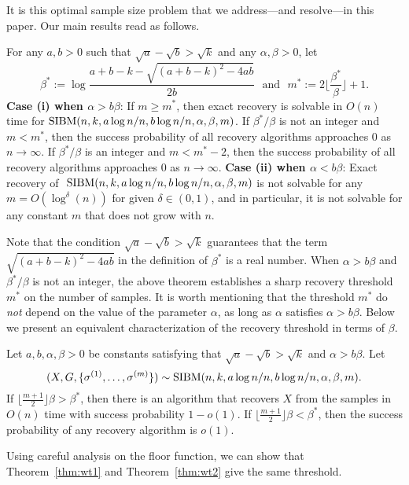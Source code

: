 \documentclass{article}
\begin{document}
\vspace*{.1in}  It is this optimal sample size problem that we address---and resolve---in this paper. 
Our main results read as follows.

\begin{theorem} \label{thm:wt1}
For any $a,b> 0$ such that $\sqrt{a}-\sqrt{b}> \sqrt{k}$ and any $\alpha,\beta>0$, let
\begin{equation} \label{eq:defstar}
\beta^\ast := 
\log\frac{a+b-k-\sqrt{(a+b-k)^2-4ab}}{2 b} \text{~~and~~}
m^\ast := 2 \Big\lfloor \frac{\beta^\ast}{\beta} \Big\rfloor +1  .
\end{equation}
{\bf Case (i) when $\alpha>b\beta$}: If $m\ge m^\ast$, then exact recovery is solvable in $O(n)$ time for $\SIBM(n,k, a\log n/n, \linebreak[4] b\log n/n,\alpha,\beta,m)$.
If $\beta^\ast/\beta$ is not an integer and $m < m^*$, then the success probability of all recovery algorithms approaches $0$ as $n\to\infty$. If $\beta^\ast/\beta$ is an integer and $m < m^* - 2$, then the success probability of all recovery algorithms approaches $0$ as $n\to\infty$.
{\bf Case (ii) when $\alpha<b\beta$}: Exact recovery of $~\operatorname{SIBM}(n,k, a\log n/n, b\log n/n,\alpha,\beta,m)$ is not solvable for any $m=O(\log^{\delta}(n))$ for given $\delta \in (0, 1)$, and in particular, it is not solvable for any constant $m$ that does not grow with $n$.
\end{theorem}
Note that the condition $\sqrt{a}-\sqrt{b} > \sqrt{k}$ guarantees that the term $\sqrt{(a+b-k)^2-4ab}$ in the definition of $\beta^\ast$ is a  real number.
When $\alpha>b\beta$ and $\beta^\ast/\beta$ is not an integer,
the above theorem establishes a sharp recovery threshold $m^\ast$ on the number of samples. It is worth mentioning that the threshold $m^\ast$ do {\em not} depend on the value of the parameter $\alpha$, as long as $\alpha$ satisfies $\alpha>b\beta$.
Below we present an equivalent characterization of the recovery threshold in terms of $\beta$.
\begin{theorem} \label{thm:wt2}
	Let $a,b,\alpha,\beta> 0$ be constants satisfying that $\sqrt{a}-\sqrt{b} > \sqrt{k}$ and $\alpha>b\beta$. 
	Let 
	$$
	(X,G,\{\sigma^{(1)},\dots,\sigma^{(m)}\}) \sim \operatorname{SIBM}(n, k, a\log n/n, b\log n/n,\alpha,\beta,m).
	$$
	If $\lfloor \frac{m+1}{2} \rfloor \beta>\beta^\ast$, then there is an algorithm that recovers $X$ from the samples in $O(n)$ time with success probability $1-o(1)$. If $\lfloor \frac{m+1}{2} \rfloor \beta <\beta^\ast$, then the success probability of any recovery algorithm is $o(1)$. 
\end{theorem}
Using careful analysis on the floor function, we can show that Theorem~\ref{thm:wt1} and Theorem~\ref{thm:wt2} give the same threshold.
\end{document}

